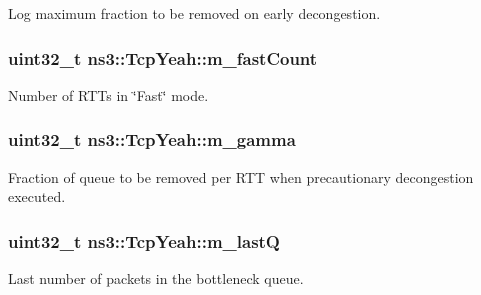 Log maximum fraction to be removed on early decongestion. 

\subsubsection[{\texorpdfstring{m\+\_\+fast\+Count}{m_fastCount}}]{\setlength{\rightskip}{0pt plus 5cm}uint32\+\_\+t ns3\+::\+Tcp\+Yeah\+::m\+\_\+fast\+Count\hspace{0.3cm}{\ttfamily [private]}}\hypertarget{classns3_1_1TcpYeah_adec63c13d5f8b6677008aa5209437483}{}\label{classns3_1_1TcpYeah_adec63c13d5f8b6677008aa5209437483}


Number of R\+T\+Ts in \char`\"{}\+Fast\char`\"{} mode. 

\subsubsection[{\texorpdfstring{m\+\_\+gamma}{m_gamma}}]{\setlength{\rightskip}{0pt plus 5cm}uint32\+\_\+t ns3\+::\+Tcp\+Yeah\+::m\+\_\+gamma\hspace{0.3cm}{\ttfamily [private]}}\hypertarget{classns3_1_1TcpYeah_ae9bf0e2021209e59fe5fddd2afff6c22}{}\label{classns3_1_1TcpYeah_ae9bf0e2021209e59fe5fddd2afff6c22}


Fraction of queue to be removed per R\+TT when precautionary decongestion executed. 

\subsubsection[{\texorpdfstring{m\+\_\+lastQ}{m_lastQ}}]{\setlength{\rightskip}{0pt plus 5cm}uint32\+\_\+t ns3\+::\+Tcp\+Yeah\+::m\+\_\+lastQ\hspace{0.3cm}{\ttfamily [private]}}\hypertarget{classns3_1_1TcpYeah_a6bea8f785d16df35d447ba70b4464fb9}{}\label{classns3_1_1TcpYeah_a6bea8f785d16df35d447ba70b4464fb9}


Last number of packets in the bottleneck queue. 

